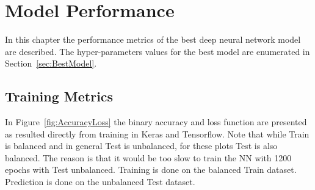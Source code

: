 \chapter{Model Performance}
\label{chapter:ModelPerformance}

In this chapter the performance metrics of the best deep neural network model are described. The hyper-parameters values for the best model are enumerated in Section~\ref{sec:BestModel}.

\section{Training Metrics}
\label{sec:Training}

In Figure~\ref{fig:AccuracyLoss} the binary accuracy and loss function are presented as resulted directly from training in Keras and Tensorflow. Note that while Train is balanced and in general Test is unbalanced, for these plots Test is also balanced. The reason is that it would be too slow to train the NN with 1200 epochs with Test unbalanced. Training is done on the balanced Train dataset. Prediction is done on the unbalanced Test dataset.

